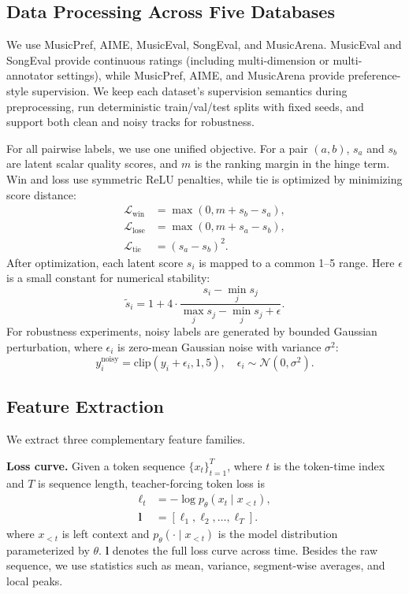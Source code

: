 \documentclass{article}
\begin{document}
\subsection{Data Processing Across Five Databases}

We use MusicPref, AIME, MusicEval, SongEval, and MusicArena.
MusicEval and SongEval provide continuous ratings
(including multi-dimension or multi-annotator settings),
while MusicPref, AIME, and MusicArena provide preference-style supervision.
We keep each dataset's supervision semantics during preprocessing,
run deterministic train/val/test splits with fixed seeds,
and support both clean and noisy tracks for robustness.

For all pairwise labels, we use one unified objective.
For a pair $(a,b)$, $s_a$ and $s_b$ are latent scalar quality scores,
and $m$ is the ranking margin in the hinge term.
Win and loss use symmetric ReLU penalties,
while tie is optimized by minimizing score distance:
\begin{equation}
\begin{aligned}
\mathcal{L}_{\text{win}} &= \max(0,m+s_b-s_a), \\
\mathcal{L}_{\text{lose}} &= \max(0,m+s_a-s_b), \\
\mathcal{L}_{\text{tie}} &= (s_a-s_b)^2.
\end{aligned}
\end{equation}
After optimization, each latent score $s_i$ is mapped to a common 1--5 range.
Here $\epsilon$ is a small constant for numerical stability:
\begin{equation}
\tilde{s}_i=1+4\cdot\frac{s_i-\min_j s_j}{\max_j s_j-\min_j s_j+\epsilon}.
\end{equation}
For robustness experiments,
noisy labels are generated by bounded Gaussian perturbation,
where $\epsilon_i$ is zero-mean Gaussian noise with variance $\sigma^2$:
\begin{equation}
y_i^{\text{noisy}}=\mathrm{clip}(y_i+\epsilon_i,1,5),\quad \epsilon_i\sim\mathcal{N}(0,\sigma^2).
\end{equation}

\subsection{Feature Extraction}

We extract three complementary feature families.

\textbf{Loss curve.}
Given a token sequence $\{x_t\}_{t=1}^{T}$,
where $t$ is the token-time index and $T$ is sequence length,
teacher-forcing token loss is
\begin{equation}
\begin{aligned}
\ell_t &= -\log p_{\theta}(x_t\mid x_{<t}), \\
\mathbf{l} &= [\ell_1,\ell_2,\ldots,\ell_T].
\end{aligned}
\end{equation}
where $x_{<t}$ is left context
and $p_{\theta}(\cdot\mid x_{<t})$ is the model distribution parameterized by $\theta$.
$\mathbf{l}$ denotes the full loss curve across time.
Besides the raw sequence, we use statistics
such as mean, variance, segment-wise averages, and local peaks.
\end{document}
